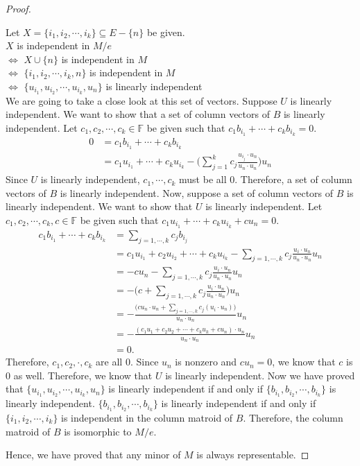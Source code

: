 \begin{proof}
\begin{enumerate}
  Let $X = \{ i_1, i_2, \cdots, i_k \} \subseteq E - \{ n \}$ be given. \\
  $X$ is independent in $M / e$ \\
  $\iff$ $X \cup \{ n \}$ is independent in $M$ \\
  $\iff$ $\{ i_1, i_2, \cdots, i_k, n \}$ is independent in $M$ \\
  $\iff$ $\{ u_{i_1}, u_{i_2}, \cdots, u_{i_k}, u_{n} \}$ is linearly independent \\
  We are going to take a close look at this set of vectors.
  Suppose $U$ is linearly independent.
  We want to show that a set of column vectors of $B$ is linearly independent.
  Let $c_1, c_2, \cdots, c_k \in \mathbb{F}$ be given such that $c_1 b_{i_1} + \cdots + c_k b_{i_k} = 0$.\\
  \begin{align*}\displaystyle 
  0 &= c_1 b_{i_1} + \cdots + c_k b_{i_k}  \\
    &= c_1 u_{i_1} + \cdots + c_k u_{i_k} - \Big( \sum_{j = 1}^{k} c_j \frac{u_{i_j} \cdot u_n}{u_n \cdot u_n} \Big) u_n
  \end{align*}
  Since $U$ is linearly independent, $c_1, \cdots, c_k$ must be all 0.
  Therefore, a set of column vectors of $B$ is linearly independent.
  Now, suppose a set of column vectors of $B$ is linearly independent.
  We want to show that $U$ is linearly independent.
  Let $c_1, c_2, \cdots, c_k, c \in \mathbb{F}$ be given such that $c_1 u_{i_1} + \cdots + c_k u_{i_k} + c u_n = 0$.\\
  \begin{align*}\displaystyle
  c_1 b_{i_1} + \cdots + c_k b_{i_k}
  &= \sum_{j=1,\cdots,k} c_j b_{i_j}  \\
  &= c_1 u_{i_1} + c_2 u_{i_2} + \cdots + c_k u_{i_k} - \sum_{j=1,\cdots,k} c_j \frac{u_i \cdot u_n}{u_n \cdot u_n} u_n  \\
  &= -c u_n - \sum_{j=1,\cdots,k} c_j \frac{u_i \cdot u_n}{u_n \cdot u_n} u_n \\
  &= -\Big(c + \sum_{j=1,\cdots,k} c_j \frac{u_i \cdot u_n}{u_n \cdot u_n}\Big)u_n \\
  &= -\frac{\Big(c{u_n \cdot u_n} + \sum_{j=1,\cdots,k} c_j (u_i \cdot u_n)\Big)}{u_n \cdot u_n}u_n \\
  &= -\frac{(c_1 u_1 + c_2 u_2 + \cdots + c_k u_k + c u_n) \cdot u_n}{u_n \cdot u_n}u_n \\
  &= 0.\end{align*}
  Therefore, $c_1, c_2, \cdot, c_k$ are all 0.
  Since $u_n$ is nonzero and $c u_n = 0$, we know that $c$ is 0 as well.
  Therefore, we know that $U$ is linearly independent.
  Now we have proved that $\{ u_{i_1}, u_{i_2}, \cdots, u_{i_k}, u_{n} \}$ is linearly independent 
  if and only if $\{ b_{i_1}, b_{i_2}, \cdots, b_{i_k} \}$ is linearly independent.
  $\{ b_{i_1}, b_{i_2}, \cdots, b_{i_k} \}$ is linearly independent if and only if $\{ i_1, i_2, \cdots, i_k \}$ is independent in the column matroid of $B$. 
  Therefore, the column matroid of $B$ is isomorphic to $M / e$.
\end{enumerate}
Hence, we have proved that any minor of $M$ is always representable.
\end{proof}

